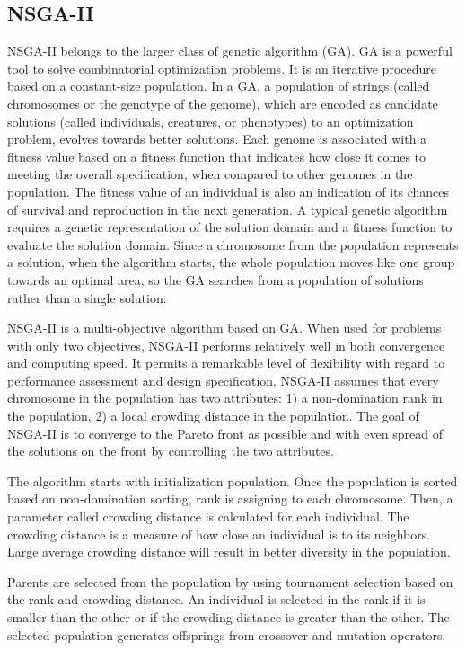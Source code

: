 \documentclass{llncs}
\begin{document}
\subsection{NSGA-II}
NSGA-II \cite{996017} belongs to the larger class of genetic algorithm (GA). GA \cite{man1996genetic} is a powerful tool to solve combinatorial optimization problems. It is an iterative procedure based on a constant-size population. In a GA, a population of strings (called chromosomes
or the genotype of the genome), which are encoded as candidate solutions (called individuals, creatures, or phenotypes) to an optimization problem, evolves towards better solutions. 
Each genome is associated with a fitness value based on a fitness function that indicates how close it comes to meeting the overall specification, when compared to other genomes in the
population. The fitness value of an individual is also an indication of its chances of survival and reproduction in the next generation. A typical genetic algorithm requires a genetic
representation of the solution domain and a fitness function to evaluate the solution domain. Since a chromosome from the population represents a solution, when the algorithm starts, 
the whole population moves like one group towards an optimal area, so the GA searches from a population of solutions rather than a single solution.

NSGA-II is a multi-objective algorithm based on GA. When used for problems with only two objectives, NSGA-II performs 
relatively well in both convergence and  computing speed. It permits a remarkable level of flexibility with regard to 
performance assessment and design specification. NSGA-II assumes that every chromosome in the population has two 
attributes: 1) a non-domination rank in the population, 2) a local crowding distance in the population. The goal of 
NSGA-II is to converge to the Pareto front as possible and with even spread of the solutions on the front by 
controlling the two attributes. 

The algorithm starts with initialization population. Once the population is sorted based on non-domination sorting, rank is assigning to each chromosome.
Then, a parameter called crowding distance is calculated for each individual. The crowding distance is a measure of how close an individual is to its neighbors. Large 
average crowding distance will result in better diversity in the population. 

Parents are selected from the population by using tournament selection based on the rank and crowding distance. An individual is selected in the rank if it is smaller than the other or 
if the crowding distance is greater than the other. The selected population generates offsprings from crossover and mutation operators. 
\end{document}
